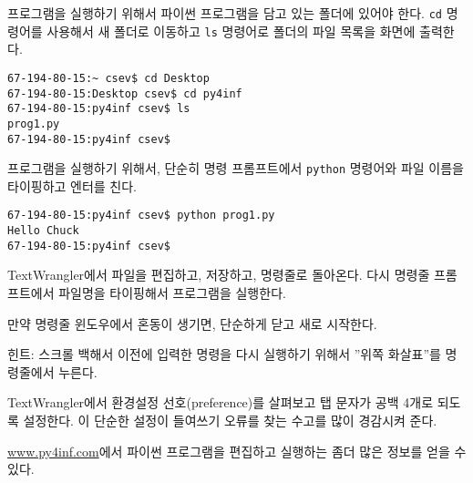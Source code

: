 프로그램을 실행하기 위해서 파이썬 프로그램을 담고 있는 폴더에 있어야 한다.
{\tt cd} 명령어를 사용해서 새 폴더로 이동하고 {\tt ls} 명령어로 폴더의 파일 목록을 화면에 출력한다.

\beforeverb
\begin{verbatim}
67-194-80-15:~ csev$ cd Desktop
67-194-80-15:Desktop csev$ cd py4inf
67-194-80-15:py4inf csev$ ls
prog1.py
67-194-80-15:py4inf csev$ 
\end{verbatim}
\afterverb
%

프로그램을 실행하기 위해서, 단순히 명령 프롬프트에서 {\tt python} 명령어와 파일 이름을 타이핑하고 엔터를 친다.

\beforeverb
\begin{verbatim}
67-194-80-15:py4inf csev$ python prog1.py
Hello Chuck
67-194-80-15:py4inf csev$ 
\end{verbatim}
\afterverb
%

TextWrangler에서 파일을 편집하고, 저장하고, 명령줄로 돌아온다.
다시 명령줄 프롬프트에서 파일명을 타이핑해서 프로그램을 실행한다.

만약 명령줄 윈도우에서 혼동이 생기면, 단순하게 닫고 새로 시작한다.

힌트: 스크롤 백해서 이전에 입력한 명령을 다시 실행하기 위해서 ''위쪽 화살표''를 명령줄에서 누른다.

TextWrangler에서 환경설정 선호(preference)를 살펴보고 탭 문자가 공백 4개로 되도록 설정한다.
이 단순한 설정이 들여쓰기 오류를 찾는 수고를 많이 경감시켜 준다.

\url{www.py4inf.com}에서 파이썬 프로그램을 편집하고 실행하는 좀더 많은 정보를 얻을 수 있다.
